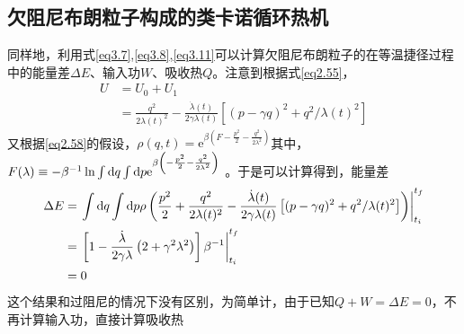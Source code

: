 \subsection{欠阻尼布朗粒子构成的类卡诺循环热机}
\label{c3e2}
\qquad 同样地，利用式\eqref{eq3.7},\quad \eqref{eq3.8},\quad \eqref{eq3.11}可以计算欠阻尼布朗粒子的在等温捷径过程中的能量差$\Delta E$、输入功$W$、吸收热$Q$。注意到根据式\eqref{eq2.55}，
\begin{equation}
    \begin{split}
        U&=U_0 + U_1 \\
    &= \frac{q^2}{2 \lambda(t)^2}  - \frac{\dot{\lambda}(t)}{2 \gamma \lambda(t)}\left[(p-\gamma q)^{2}+ q^{2}/\lambda(t)^2\right]
    \end{split}  
    \label{eq3.42}
\end{equation}
又根据\eqref{eq2.58}的假设，$\rho(q, t)= \mathrm{e}^{{\beta\left(F - \frac{p^2}{2}-\frac{q^{2}}{2 \lambda^2}\right)}}$其中，$F(\lambda) \equiv-\beta^{-1} \ln  \int \mathrm{d} q \int \mathrm{d} p \mathrm{e}^{{\beta\left(-\frac{p^2}{2}-\frac{q^{2}}{2 \lambda^2}\right)}} $ 
。于是可以计算得到，能量差
\begin{equation}
    \begin{split}
        \Delta E&=\left.\int \mathrm{d} q \int \mathrm{d} p \rho \left( \frac{p^2}{2} + \frac{q^2}{2 \lambda(t)^2}  - \frac{\dot{\lambda}(t)}{2 \gamma \lambda(t)}\left[(p-\gamma q)^{2}+ q^{2}/\lambda(t)^2\right] \right)\right|_{t_{i}} ^{t_{f}}\\
        &=\left. \left[1-\frac{\dot{\lambda}}{2 \gamma \lambda}\left(2+\gamma^{2} \lambda^{2}\right)\right] \beta^{-1}\right|_{t_{i}} ^{t_{f}}\\
        &=0
    \end{split}
    \label{eq3.43}
\end{equation}
这个结果和过阻尼的情况下没有区别，为简单计，由于已知$Q + W = \Delta E =0$，不再计算输入功，直接计算吸收热
